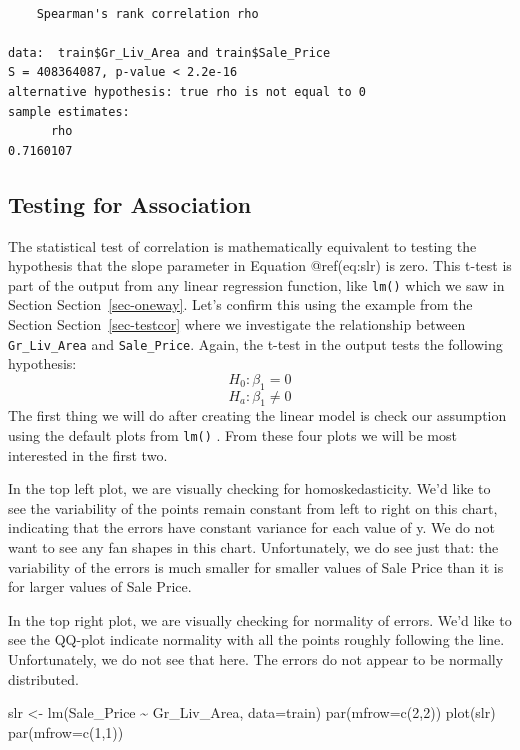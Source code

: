 \documentclass[
  letterpaper,
  DIV=11,
  numbers=noendperiod]{scrreprt}
\newenvironment{Shaded}{\begin{snugshade}}{\end{snugshade}}
\newcommand{\AttributeTok}[1]{\textcolor[rgb]{0.40,0.45,0.13}{#1}}
\newcommand{\DecValTok}[1]{\textcolor[rgb]{0.68,0.00,0.00}{#1}}
\newcommand{\FunctionTok}[1]{\textcolor[rgb]{0.28,0.35,0.67}{#1}}
\newcommand{\NormalTok}[1]{\textcolor[rgb]{0.00,0.23,0.31}{#1}}
\newcommand{\OtherTok}[1]{\textcolor[rgb]{0.00,0.23,0.31}{#1}}
\newcommand{\SpecialCharTok}[1]{\textcolor[rgb]{0.37,0.37,0.37}{#1}}
\begin{document}
\begin{verbatim}

    Spearman's rank correlation rho

data:  train$Gr_Liv_Area and train$Sale_Price
S = 408364087, p-value < 2.2e-16
alternative hypothesis: true rho is not equal to 0
sample estimates:
      rho 
0.7160107 
\end{verbatim}

\hypertarget{testing-for-association}{%
\subsection{Testing for Association}\label{testing-for-association}}

The statistical test of correlation is mathematically equivalent to
testing the hypothesis that the slope parameter in Equation @ref(eq:slr)
is zero. This t-test is part of the output from any linear regression
function, like \texttt{lm()} which we saw in Section
Section~\ref{sec-oneway}. Let's confirm this using the example from the
Section Section~\ref{sec-testcor} where we investigate the relationship
between \texttt{Gr\_Liv\_Area} and \texttt{Sale\_Price}. Again, the
t-test in the output tests the following hypothesis: \[H_0: \beta_1=0\]
\[H_a: \beta_1 \neq 0\] The first thing we will do after creating the
linear model is check our assumption using the default plots from
\texttt{lm()} . From these four plots we will be most interested in the
first two.

In the top left plot, we are visually checking for homoskedasticity.
We'd like to see the variability of the points remain constant from left
to right on this chart, indicating that the errors have constant
variance for each value of y. We do not want to see any fan shapes in
this chart. Unfortunately, we do see just that: the variability of the
errors is much smaller for smaller values of Sale Price than it is for
larger values of Sale Price.

In the top right plot, we are visually checking for normality of errors.
We'd like to see the QQ-plot indicate normality with all the points
roughly following the line. Unfortunately, we do not see that here. The
errors do not appear to be normally distributed.

\begin{Shaded}
\begin{Highlighting}[]
\NormalTok{slr }\OtherTok{\textless{}{-}} \FunctionTok{lm}\NormalTok{(Sale\_Price }\SpecialCharTok{\textasciitilde{}}\NormalTok{ Gr\_Liv\_Area, }\AttributeTok{data=}\NormalTok{train)}
\FunctionTok{par}\NormalTok{(}\AttributeTok{mfrow=}\FunctionTok{c}\NormalTok{(}\DecValTok{2}\NormalTok{,}\DecValTok{2}\NormalTok{))}
\FunctionTok{plot}\NormalTok{(slr)}
\FunctionTok{par}\NormalTok{(}\AttributeTok{mfrow=}\FunctionTok{c}\NormalTok{(}\DecValTok{1}\NormalTok{,}\DecValTok{1}\NormalTok{))}
\end{Highlighting}
\end{Shaded}
\end{document}
